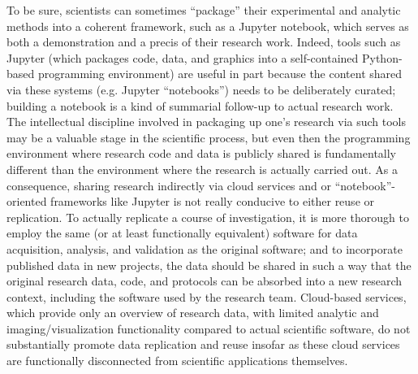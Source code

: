 \documentclass[11pt,letterpaper]{article}
\newcommand{\p}[1]{

\vspace{1em}#1}
\newcommand{\q}[1]{{\fontfamily{qcr}\selectfont ``}#1{\fontfamily{qcr}\selectfont ''}}
\begin{document}
{\p{To be sure, scientists can sometimes 
\q{package} their experimental and analytic 
methods into a coherent framework, such as a 
Jupyter notebook, which serves as both a 
demonstration and a precis of their 
research work.  Indeed, tools such 
as Jupyter (which packages code, data, 
and graphics into a self-contained Python-based 
programming environment) are useful in part 
because the content shared via these 
systems (e.g. Jupyter \q{notebooks}) needs 
to be deliberately curated; building a 
notebook is a kind of summarial follow-up to 
actual research work.  The intellectual discipline 
involved in packaging up one's research via 
such tools may be a valuable stage in the 
scientific process, but even then the programming 
environment where research code and data 
is publicly shared is fundamentally different 
than the environment where the research is 
actually carried out.  As a consequence, 
sharing research indirectly via cloud 
services and or \q{notebook}-oriented 
frameworks like Jupyter is not really 
conducive to either reuse or replication.  
To actually replicate a course of 
investigation, it is more thorough 
to employ the same (or at least 
functionally equivalent) software for 
data acquisition, analysis, and validation 
as the original software; and to incorporate 
published data in new projects, the data 
should be shared in such a way that 
the original research data, code, and 
protocols can be absorbed into a new 
research context, including the software 
used by the research team.  Cloud-based 
services, which provide only an overview 
of research data, with limited analytic 
and imaging/visualization functionality 
compared to actual scientific software, 
do not substantially promote data 
replication and reuse insofar as 
these cloud services are functionally 
disconnected from scientific applications 
themselves.}

}
\end{document}
